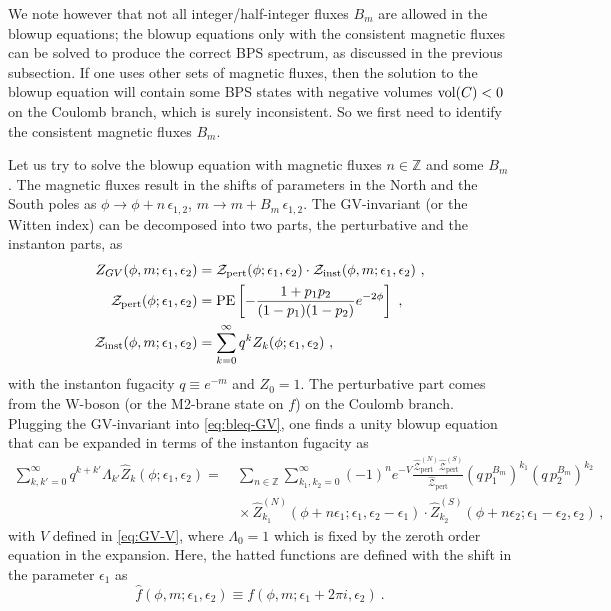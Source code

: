 We note however that not all integer/half-integer fluxes $B_m$ are allowed in the blowup equations; the blowup equations only with the consistent magnetic fluxes can be solved to produce the correct BPS spectrum, as discussed in the previous subsection. If one uses other sets of magnetic fluxes, then the solution to the blowup equation will contain some BPS states with negative volumes ${\rm vol}(C)<0$ on the Coulomb branch, which is surely inconsistent. So we first need to identify the consistent magnetic fluxes $B_m$.

Let us try to solve the blowup equation with magnetic fluxes $n\in\mathbb{Z}$ and some $B_m$. The magnetic fluxes result in the shifts of parameters in the North and the South poles as $\phi \to \phi + n \,\epsilon_{1,2}$, $m \to m + B_m\,\epsilon_{1,2}$. The GV-invariant (or the Witten index) can be decomposed into two parts, the perturbative and the instanton parts, as
\begin{align}
	Z_{GV}(\phi,m;\epsilon_1,\epsilon_2) &= \mathcal{Z}_{\rm pert}(\phi;\epsilon_1,\epsilon_2)\cdot \mathcal{Z}_{\rm inst}(\phi,m;\epsilon_1,\epsilon_2) \ , \nonumber \\
	\mathcal{Z}_{\rm pert}(\phi;\epsilon_1,\epsilon_2) & ={\rm PE}\left[-\frac{1+p_1p_2}{(1-p_1)(1-p_2)}e^{-2\phi}\right] \ , \nonumber \\
	\mathcal{Z}_{\rm inst}(\phi,m;\epsilon_1,\epsilon_2) &= \sum_{k=0}^\infty q^k Z_k(\phi; \epsilon_1, \epsilon_2) \ ,
\end{align}
with the instanton fugacity $q\equiv e^{-m}$ and $Z_0=1$. The perturbative part comes from the W-boson (or the M2-brane state on $f$) on the Coulomb branch. Plugging the GV-invariant into \eqref{eq:bleq-GV}, one finds a unity blowup equation that can be expanded in terms of the instanton fugacity as
\begin{align}
\sum_{k,k'=0}^\infty q^{k+k'}\Lambda_{k'} \hat{Z}_k(\phi; \epsilon_1, \epsilon_2)=& \
\sum_{n \in \mathbb{Z}}  \sum_{k_1, k_2=0}^\infty (-1)^n e^{-V}\frac{\hat{\mathcal{Z}}_{\text{pert}}^{(N)}\hat{\mathcal{Z}}_{\text{pert}}^{(S)}}{\hat{\mathcal{Z}}_{\text{pert}}} (q \,p_1^{B_m})^{k_1} (q\, p_2^{B_m})^{k_2}  \\
&\  \times \hat{Z}_{k_1}^{(N)}(\phi + n\epsilon_1 ; \epsilon_1, \epsilon_2 - \epsilon_1) \cdot \hat{Z}^{(S)}_{k_2}(\phi + n\epsilon_2; \epsilon_1 - \epsilon_2, \epsilon_2)\,, \nonumber
\end{align}
with $V$ defined in \eqref{eq:GV-V}, where $\Lambda_0=1$ which is fixed by the zeroth order equation in the expansion. Here, the hatted functions are defined with the shift in the parameter $\epsilon_1$ as
\begin{equation} 
	\hat{f}(\phi,m;\epsilon_1,\epsilon_2)\equiv f(\phi,m;\epsilon_1+2\pi i,\epsilon_2) \ .
\end{equation}

